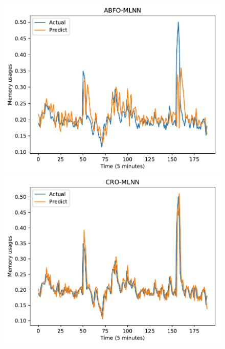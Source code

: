 \documentclass[11pt,twoside]{article}
\begin{document}
\begin{multicols}{2}
\begin{figure}[!ht]
\begin{minipage}[b]{0.33\linewidth}
  \end{minipage} 
  
    \begin{minipage}[b]{0.33\linewidth}
    \centering
    \includegraphics[width=0.9\linewidth]{predict/k5/ram_k5_abfo_mlnn.pdf} 
  \end{minipage}
  \begin{minipage}[b]{0.33\linewidth}
    \centering
    \includegraphics[width=0.9\linewidth]{predict/k5/ram_k5_cro_mlnn.pdf} 
  \end{minipage} 
  \begin{minipage}[b]{0.33\linewidth}
    \centering

\end{minipage}
\end{figure}
\end{multicols}
\end{document}
